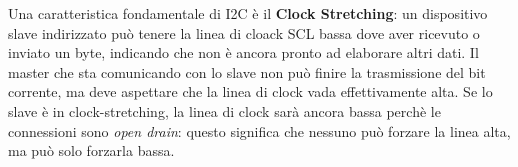 Una caratteristica fondamentale di I2C è il \textbf{Clock Stretching}: un dispositivo slave indirizzato può tenere la linea di cloack SCL bassa dove aver ricevuto o inviato un byte, indicando che non è ancora pronto ad elaborare altri dati.
Il master che sta comunicando con lo slave non può finire la trasmissione del bit corrente, ma deve aspettare che la linea di clock vada effettivamente alta. Se lo slave è in clock-stretching, la linea di clock sarà ancora bassa perchè le connessioni sono \textit{open drain}: questo significa che nessuno può forzare la linea alta, ma può solo forzarla bassa.
